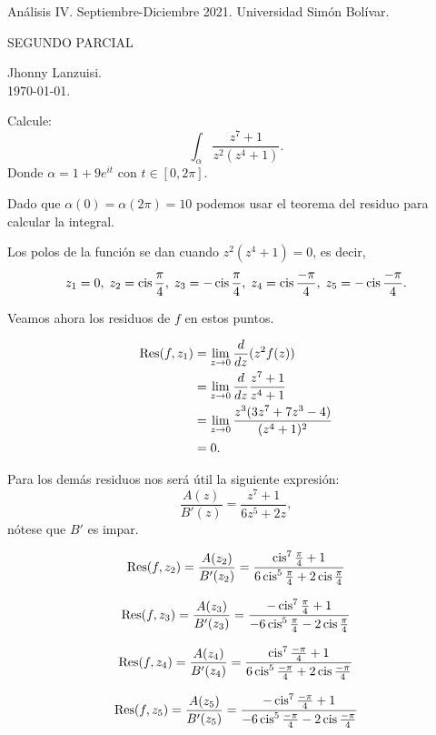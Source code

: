 \documentclass[11pt,letter]{article}
\begin{document}
\begin{flushleft}
	\begin{center}
		\small Análisis IV. Septiembre-Diciembre 2021. Universidad Simón Bolívar.
	\end{center}

	\vspace{2\baselineskip}
	{\Large{} SEGUNDO PARCIAL}

	\vspace{.5\baselineskip}
	Jhonny Lanzuisi.\\\today.
\end{flushleft}

\setcounter{exer}{1}

\exercise Calcule:
\[
	\int_\alpha \frac{z^7+1}{z^2(z^4+1)}.
\]
Donde $\alpha=1+9e^{it}$ con $t\in[0,2\pi]$.

\solution Dado que $\alpha(0)=\alpha(2\pi)=10$ podemos usar el teorema
del residuo para calcular la integral.

Los polos de la función se dan cuando $z^2(z^4+1)=0$, es decir,
\[
	z_1=0,\;
	z_2=\operatorname{cis}\frac{\pi}{4},\;
	z_3=-\operatorname{cis}\frac{\pi}{4},\;
	z_4=\operatorname{cis}\frac{-\pi}{4},\;
	z_5=-\operatorname{cis}\frac{-\pi}{4}.
\]

Veamos ahora los residuos de $f$ en estos puntos.

\begin{align*}
	\operatorname{Res}(f, z_1)&=\lim_{z\to0} \frac{d}{dz} (z^2f(z))\\
		      &=\lim_{z\to0} \frac{d}{dz} \frac{z^7+1}{z^4+1}\\
		      &=\lim_{z\to0} \frac{z^3(3z^7+7z^3-4)}{(z^4+1)^2}\\
		      &= 0.
\end{align*}

Para los demás residuos nos será útil la siguiente expresión:
\[\frac{A(z)}{B'(z)} = \frac{z^7+1}{6z^5+2z},\]
nótese que $B'$ es impar.

\[
	\operatorname{Res}(f, z_2) = \frac{A(z_2)}{B'(z_2)}
			   = \frac{\operatorname{cis}^7\frac{\pi}{4} + 1}
			   		{6\operatorname{cis}^5\frac{\pi}{4}+2\operatorname{cis}\frac{\pi}{4}}
\]

\[
	\operatorname{Res}(f, z_3) = \frac{A(z_3)}{B'(z_3)}
			   = \frac{-\operatorname{cis}^7\frac{\pi}{4} + 1}
			   		{-6\operatorname{cis}^5\frac{\pi}{4}-2\operatorname{cis}\frac{\pi}{4}}
\]

\[
	\operatorname{Res}(f, z_4) = \frac{A(z_4)}{B'(z_4)}
			   = \frac{\operatorname{cis}^7\frac{-\pi}{4} + 1}
			   		{6\operatorname{cis}^5\frac{-\pi}{4}+2\operatorname{cis}\frac{-\pi}{4}}
\]

\[
	\operatorname{Res}(f, z_5) = \frac{A(z_5)}{B'(z_5)}
			   = \frac{-\operatorname{cis}^7\frac{-\pi}{4} + 1}
			   		{-6\operatorname{cis}^5\frac{-\pi}{4}-2\operatorname{cis}\frac{-\pi}{4}}
\]
\end{document}
